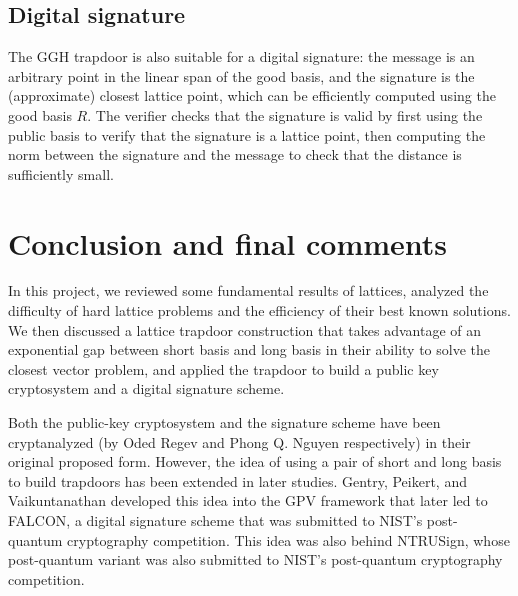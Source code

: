 \documentclass[letterpaper,12pt]{article}
\begin{document}
\subsection{Digital signature}
The GGH trapdoor is also suitable for a digital signature: the message is an arbitrary point in the linear span of the good basis, and the signature is the (approximate) closest lattice point, which can be efficiently computed using the good basis $R$. The verifier checks that the signature is valid by first using the public basis to verify that the signature is a lattice point, then computing the norm between the signature and the message to check that the distance is sufficiently small.

\section{Conclusion and final comments}
In this project, we reviewed some fundamental results of lattices, analyzed the difficulty of hard lattice problems and the efficiency of their best known solutions. We then discussed a lattice trapdoor construction that takes advantage of an exponential gap between short basis and long basis in their ability to solve the closest vector problem, and applied the trapdoor to build a public key cryptosystem and a digital signature scheme.

Both the public-key cryptosystem and the signature scheme have been cryptanalyzed (by Oded Regev and Phong Q. Nguyen respectively) in their original proposed form. However, the idea of using a pair of short and long basis to build trapdoors has been extended in later studies. Gentry, Peikert, and Vaikuntanathan developed this idea into the GPV framework that later led to FALCON, a digital signature scheme that was submitted to NIST's post-quantum cryptography competition. This idea was also behind NTRUSign, whose post-quantum variant was also submitted to NIST's post-quantum cryptography competition.
\end{document}

